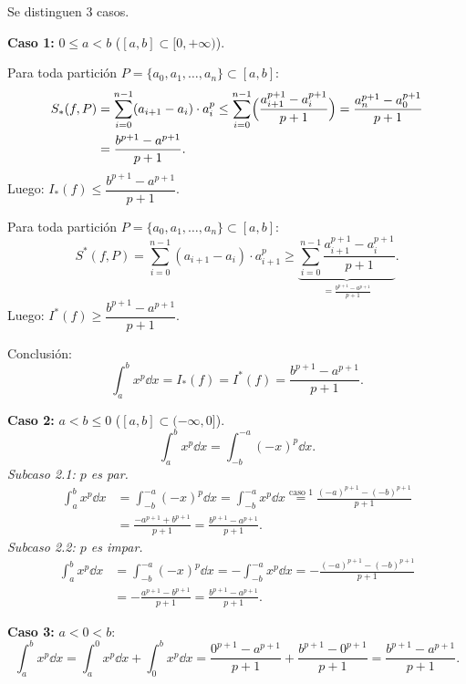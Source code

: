 \documentclass[11pt,a4paper]{article}
\begin{document}
\begin{demo}
Se distinguen 3 casos.

\textbf{Caso 1:} $0\le a<b$ \quad ($[a,b]\subset[0,+\infty)$).

Para toda partición $P=\{a_0,a_1,\dots,a_n\}\subset[a,b]$:
\begin{align*}
  S_*(f,P)&=\sum_{i=0}^{n-1}(a_{i+1}-a_i)\cdot a_i^p
  \le\sum_{i=0}^{n-1}\Bigl(\frac{a_{i+1}^{p+1}-a_i^{p+1}}{p+1}\Bigr)
  =\frac{a_n^{p+1}-a_0^{p+1}}{p+1}\\
  &=\frac{b^{p+1}-a^{p+1}}{p+1}.
\end{align*}
Luego: $I_*(f)\le\dfrac{b^{p+1}-a^{p+1}}{p+1}$.

Para toda partición $P=\{a_0,a_1,\dots,a_n\}\subset[a,b]$:
\[
  S^*(f,P)=\sum_{i=0}^{n-1}(a_{i+1}-a_i)\cdot a_{i+1}^p
  \ge\underbrace{\sum_{i=0}^{n-1}\frac{a_{i+1}^{p+1}-a_i^{p+1}}{p+1}}_{=\frac{b^{p+1}-a^{p+1}}{p+1}}.
\]
Luego: $I^*(f)\ge\dfrac{b^{p+1}-a^{p+1}}{p+1}$.

Conclusión:
\[
  \int_a^b x^p\dd x=I_*(f)=I^*(f)=\frac{b^{p+1}-a^{p+1}}{p+1}.
\]

\textbf{Caso 2:} $a<b\le0$ \quad ($[a,b]\subset(-\infty,0]$).
\[
  \int_a^b x^p\dd x=\int_{-b}^{-a}(-x)^p\dd x.
\]
\emph{Subcaso 2.1: $p$ es par.}
\begin{align*}
  \int_a^b x^p\dd x&=\int_{-b}^{-a}(-x)^p\dd x=\int_{-b}^{-a}x^p\dd x
  \overset{\text{caso 1}}{=}\frac{(-a)^{p+1}-(-b)^{p+1}}{p+1}\\
  &=\frac{-a^{p+1}+b^{p+1}}{p+1}=\frac{b^{p+1}-a^{p+1}}{p+1}.
\end{align*}
\emph{Subcaso 2.2: $p$ es impar.}
\begin{align*}
  \int_a^b x^p\dd x&=\int_{-b}^{-a}(-x)^p\dd x=-\int_{-b}^{-a}x^p\dd x
  =-\frac{(-a)^{p+1}-(-b)^{p+1}}{p+1}\\
  &=-\frac{a^{p+1}-b^{p+1}}{p+1}=\frac{b^{p+1}-a^{p+1}}{p+1}.
\end{align*}

\textbf{Caso 3:} $a<0<b$:
\[
  \int_a^b x^p\dd x=\int_a^0 x^p\dd x+\int_0^b x^p\dd x
  =\frac{0^{p+1}-a^{p+1}}{p+1}+\frac{b^{p+1}-0^{p+1}}{p+1}
  =\frac{b^{p+1}-a^{p+1}}{p+1}.
\]
\end{demo}
\end{document}
